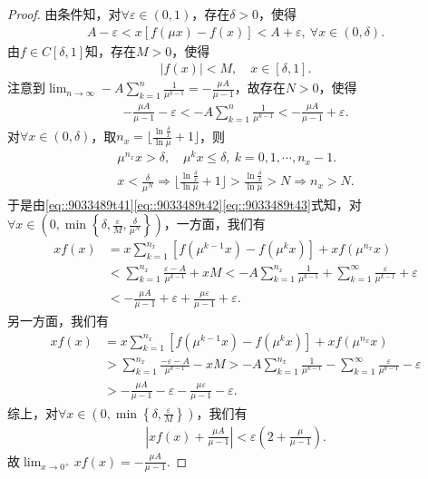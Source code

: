 \documentclass[../../main.tex]{subfiles}
\begin{document}
\begin{proof}
由条件知，对$\forall \varepsilon \in (0,1)$，存在$\delta > 0$，使得
\begin{align}
A - \varepsilon < x\left[ f\left( \mu x \right) - f\left( x \right) \right] < A + \varepsilon, \ \forall x \in (0,\delta). \label{eq::9033489t41}
\end{align}
由$f \in C\left[ \delta,1 \right]$知，存在$M > 0$，使得
\begin{align}
\left| f\left( x \right) \right| < M, \quad x \in \left[ \delta,1 \right]. \label{eq::9033489t42}
\end{align}
注意到$\lim_{n \to \infty} -A\sum_{k=1}^n \frac{1}{\mu^{k-1}} = -\frac{\mu A}{\mu - 1}$，故存在$N > 0$，使得
\begin{align}
-\frac{\mu A}{\mu - 1} - \varepsilon < -A\sum_{k=1}^n \frac{1}{\mu^{k-1}} < -\frac{\mu A}{\mu - 1} + \varepsilon. \label{eq::9033489t43}
\end{align}
对$\forall x \in (0,\delta)$，取$n_x = \lfloor \frac{\ln \frac{\delta}{x}}{\ln \mu} + 1 \rfloor$，则
\begin{gather*}
\mu^{n_x} x > \delta, \quad \mu^k x \leqslant \delta, \ k = 0,1,\cdots,n_x - 1.\\
x < \frac{\delta}{\mu^N} \Longrightarrow \lfloor \frac{\ln \frac{\delta}{x}}{\ln \mu} + 1 \rfloor > \frac{\ln \frac{\delta}{x}}{\ln \mu} > N \Longrightarrow n_x > N.
\end{gather*}
于是由\eqref{eq::9033489t41}\eqref{eq::9033489t42}\eqref{eq::9033489t43}式知，对$\forall x \in \left( 0,\min \left\{ \delta, \frac{\varepsilon}{M}, \frac{\delta}{\mu^N} \right\} \right)$，一方面，我们有
\begin{align*}
xf\left( x \right) &= x\sum_{k=1}^{n_x} \left[ f\left( \mu^{k-1}x \right) - f\left( \mu^k x \right) \right] + xf\left( \mu^{n_x} x \right) \\
&< \sum_{k=1}^{n_x} \frac{\varepsilon - A}{\mu^{k-1}} + xM < -A\sum_{k=1}^{n_x} \frac{1}{\mu^{k-1}} + \sum_{k=1}^{\infty} \frac{\varepsilon}{\mu^{k-1}} + \varepsilon \\
&< -\frac{\mu A}{\mu - 1} + \varepsilon + \frac{\mu \varepsilon}{\mu - 1} + \varepsilon.
\end{align*}
另一方面，我们有
\begin{align*}
xf\left( x \right) &= x\sum_{k=1}^{n_x} \left[ f\left( \mu^{k-1}x \right) - f\left( \mu^k x \right) \right] + xf\left( \mu^{n_x} x \right) \\
&> \sum_{k=1}^{n_x} \frac{-\varepsilon - A}{\mu^{k-1}} - xM > -A\sum_{k=1}^{n_x} \frac{1}{\mu^{k-1}} - \sum_{k=1}^{\infty} \frac{\varepsilon}{\mu^{k-1}} - \varepsilon \\
&> -\frac{\mu A}{\mu - 1} - \varepsilon - \frac{\mu \varepsilon}{\mu - 1} - \varepsilon.
\end{align*}
综上，对$\forall x \in \left( 0,\min \left\{ \delta, \frac{\varepsilon}{M} \right\} \right)$，我们有
\begin{align*}
\left| xf\left( x \right) + \frac{\mu A}{\mu - 1} \right| < \varepsilon \left( 2 + \frac{\mu}{\mu - 1} \right).
\end{align*}
故$\lim_{x \to 0^+} xf\left( x \right) = -\frac{\mu A}{\mu - 1}.$


\end{proof}
\end{document}

